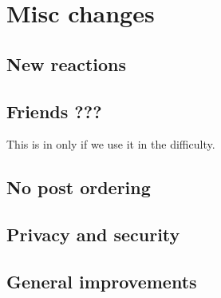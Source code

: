 \chapter{Misc changes}
\section{New reactions}
\section{Friends ???}
This is in only if we use it in the difficulty.
\section{No post ordering}
\section{Privacy and security}
\section{General improvements}